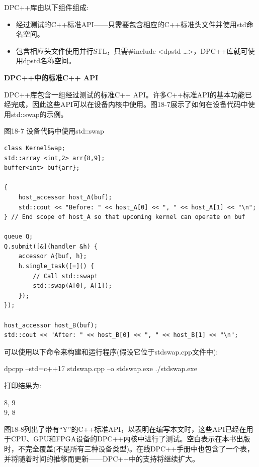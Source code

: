 DPC++库由以下组件组成:\par

\begin{itemize}
	\item 经过测试的C++标准API——只需要包含相应的C++标准头文件并使用std命名空间。
	\item 包含相应头文件使用并行STL，只需\#include <dpstd …>，DPC++库就可使用dpstd名称空间。
\end{itemize}

\hspace*{\fill} \par %
\textbf{DPC++中的标准C++ API}

DPC++库包含一组经过测试的标准C++ API。许多C++标准API的基本功能已经完成，因此这些API可以在设备内核中使用。图18-7展示了如何在设备代码中使用std::swap的示例。\par

\hspace*{\fill} \par %
图18-7 设备代码中使用std::swap
\begin{lstlisting}[caption={}]
class KernelSwap;
std::array <int,2> arr{8,9};
buffer<int> buf{arr};

{
	host_accessor host_A(buf);
	std::cout << "Before: " << host_A[0] << ", " << host_A[1] << "\n";
} // End scope of host_A so that upcoming kernel can operate on buf

queue Q;
Q.submit([&](handler &h) {
	accessor A{buf, h};
	h.single_task([=]() {
		// Call std::swap!
		std::swap(A[0], A[1]);
	});
});

host_accessor host_B(buf);
std::cout << "After: " << host_B[0] << ", " << host_B[1] << "\n";
\end{lstlisting}

可以使用以下命令来构建和运行程序(假设它位于stdswap.cpp文件中):\par

\begin{tcolorbox}[colback=white,colframe=black]
dpcpp –std=c++17 stdswap.cpp –o stdswap.exe ./stdswap.exe
\end{tcolorbox}

打印结果为:\par

\begin{tcolorbox}[colback=white,colframe=black]
8, 9\\
9, 8
\end{tcolorbox}

图18-8列出了带有“Y”的C++标准API，以表明在编写本文时，这些API已经在用于CPU、GPU和FPGA设备的DPC++内核中进行了测试。空白表示在本书出版时，不完全覆盖(不是所有三种设备类型)。在线DPC++手册中也包含了一个表，并将随着时间的推移而更新——DPC++中的支持将继续扩大。\par

